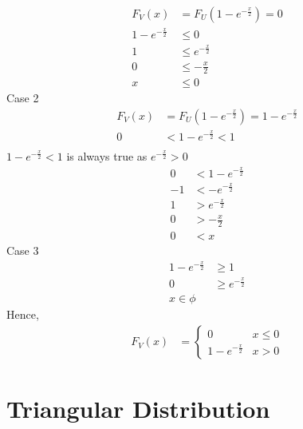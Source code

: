 \documentclass[journal,12pt,twocolumn]{IEEEtran}
\renewcommand\thesection{\arabic{section}}
\begin{document}
\begin{enumerate}[label=\thesection.\arabic*
,ref=\thesection.\theenumi]
\begin{align}
    F_V(x) &= F_U(1-e^{-\frac{x}{2}}) = 0\\
    1-e^{-\frac{x}{2}} &\le 0\\
    1 &\le e^{-\frac{x}{2}}\\
    0 &\le -\frac{x}{2}\\
    x &\le 0
\end{align}
Case 2
\begin{align}
    F_V(x) &= F_U(1-e^{-\frac{x}{2}}) = 1-e^{-\frac{x}{2}}\\
    0 &< 1-e^{-\frac{x}{2}} < 1 \\
\end{align}
$1-e^{-\frac{x}{2}} < 1$ is always true as $e^{-\frac{x}{2}} > 0$
\begin{align}
    0 &< 1-e^{-\frac{x}{2}}\\
    -1 &< -e^{-\frac{x}{2}}\\
    1 &> e^{-\frac{x}{2}}\\
    0 &> -\frac{x}{2}\\
    0 &< x
\end{align}
Case 3
\begin{align}
    1-e^{-\frac{x}{2}} &\ge 1\\
    0 &\ge e^{-\frac{x}{2}}\\
    x \in \phi
\end{align}
Hence,
\begin{align}
    F_V(x) &= \begin{cases}
                0 & x\le0\\
                1 - e^{-\frac{x}{2}} & x>0
    \end{cases}
\end{align}
\end{enumerate}
\section{Triangular Distribution}
\end{document}
